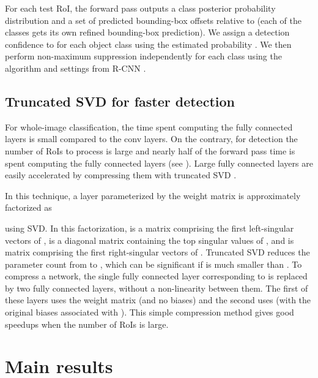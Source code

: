 \documentclass[10pt,twocolumn,letterpaper]{article}
\newcommand{\roi}{RoI\xspace}
\begin{document}
For each test \roi , the forward pass outputs a class posterior probability distribution  and a set of predicted bounding-box offsets relative to  (each of the  classes gets its own refined bounding-box prediction).
We assign a detection confidence to  for each object class  using the estimated probability .
We then perform non-maximum suppression independently for each class using the algorithm and settings from R-CNN \cite{girshick2014rcnn}.

\subsection{Truncated SVD for faster detection}
For whole-image classification, the time spent computing the fully connected layers is small compared to the conv layers.
On the contrary, for detection the number of {\roi}s to process is large and nearly half of the forward pass time is spent computing the fully connected layers (see ).
Large fully connected layers are easily accelerated by compressing them with truncated SVD \cite{Denton2014SVD,Xue2013svd}.

In this technique, a layer parameterized by the  weight matrix  is approximately factorized as

using SVD.
In this factorization,  is a  matrix comprising the first  left-singular vectors of ,  is a  diagonal matrix containing the top  singular values of , and  is  matrix comprising the first  right-singular vectors of .
Truncated SVD reduces the parameter count from  to , which can be significant if  is much smaller than .
To compress a network, the single fully connected layer corresponding to  is replaced by two fully connected layers, without a non-linearity between them.
The first of these layers uses the weight matrix  (and no biases) and the second uses  (with the original biases associated with ).
This simple compression method gives good speedups when the number of {\roi}s is large.


 \section{Main results}
\end{document}
